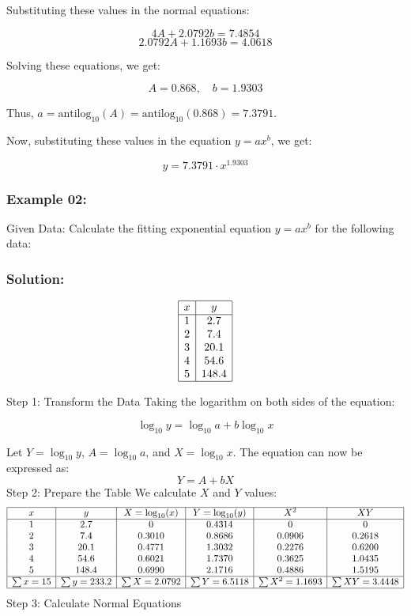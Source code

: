 \documentclass[12pt]{article}
\begin{document}
Substituting these values in the normal equations:

\[
4A + 2.0792b = 7.4854
\]
\[
2.0792A + 1.1693b = 4.0618
\]

Solving these equations, we get:

\[
A = 0.868, \quad b = 1.9303
\]

Thus, \( a = \text{antilog}_{10}(A) = \text{antilog}_{10}(0.868) = 7.3791 \).

Now, substituting these values in the equation \( y = ax^b \), we get:

\[
y = 7.3791 \cdot x^{1.9303}
\]

\subsubsection*{\hspace{0.5cm}Example 02:}
Given Data:
Calculate the fitting exponential equation \(y = ax^b\) for the following data:
\subsubsection*{\hspace{0.5cm}Solution:}
\[
\begin{array}{|c|c|}
\hline
x & y \\
\hline
1 & 2.7 \\
2 & 7.4 \\
3 & 20.1 \\
4 & 54.6 \\
5 & 148.4 \\
\hline
\end{array}
\]

Step 1: Transform the Data
Taking the logarithm on both sides of the equation:

\[
\log_{10} y = \log_{10} a + b \log_{10} x
\]

Let \(Y = \log_{10} y\), \(A = \log_{10} a\), and \(X = \log_{10} x\). The equation can now be expressed as:
\[
Y = A + bX
\]
Step 2: Prepare the Table
We calculate \(X\) and \(Y\) values:
\[
\begin{array}{|c|c|c|c|c|c|}
\hline
x & y & X = \log_{10}(x) & Y = \log_{10}(y) & X^2 & XY \\
\hline
1 & 2.7 & 0 & 0.4314 & 0 & 0 \\
2 & 7.4 & 0.3010 & 0.8686 & 0.0906 & 0.2618 \\
3 & 20.1 & 0.4771 & 1.3032 & 0.2276 & 0.6200 \\
4 & 54.6 & 0.6021 & 1.7370 & 0.3625 & 1.0435 \\
5 & 148.4 & 0.6990 & 2.1716 & 0.4886 & 1.5195 \\
\hline
\sum x = 15 & \sum y = 233.2 & \sum X = 2.0792 & \sum Y = 6.5118 & \sum X^2 = 1.1693 & \sum XY = 3.4448 \\
\hline
\end{array}
\]
Step 3: Calculate Normal Equations
\end{document}

